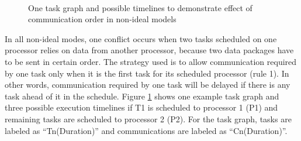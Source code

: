 \documentclass[msc,deptreport, cs]{infthesis}
\begin{document}
\begin{figure}[!htb]
  \centering
  \vspace{1em}
  \hspace{3em}
   \hspace{4em}
   \\
   \hspace{1em}
  \caption{One task graph and possible timelines to demonstrate effect of communication order in non-ideal models}
  \label{fig:conflict1}
\end{figure}

In all non-ideal modes, one conflict occurs when two tasks scheduled on one processor relies on data from another processor, because two data packages have to be sent in certain order. The strategy used is to allow communication required by one task only when it is the first task for its scheduled processor (rule 1). In other words, communication required by one task will be delayed if there is any task ahead of it in the schedule. Figure \ref{fig:conflict1} shows one example task graph and three possible execution timelines if T1 is scheduled to processor 1 (P1) and remaining tasks are scheduled to processor 2 (P2). For the task graph, tasks are labeled as ``Tn(Duration)'' and communications are labeled as ``Cn(Duration)''.
\end{document}

